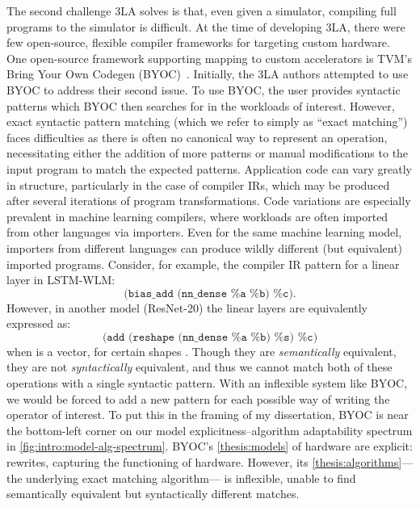 The second challenge 3LA solves
  is that,
  even given a simulator,
  compiling
  full programs to the simulator
  is difficult.
At the time of developing 3LA,
  there were few open-source, flexible 
  compiler frameworks
  for targeting custom hardware.
One open-source framework
  supporting mapping
  to custom accelerators
  is TVM's Bring Your Own Codegen (BYOC)~\cite{byoc,chen2021byoc}.
Initially, the 3LA authors
  attempted to use BYOC
  to address their second issue.
To use BYOC, the user
  provides syntactic patterns
  which BYOC then searches for
  in the workloads of interest.
However,
  exact syntactic pattern matching 
  (which we refer to simply as
    ``exact matching'')
  faces difficulties
  as there is often no canonical way
  to represent an operation,
  necessitating either the addition of more patterns
  or manual modifications to the input program
  to match the expected patterns.
Application code can vary greatly in structure,
  particularly in the case of compiler IRs,
  which may be produced after several iterations
  of program transformations.
Code variations are especially prevalent
  in machine learning compilers,
  where workloads are often imported
  from other languages via importers.
Even for the same machine learning model,
  importers from different languages
  can produce wildly different (but equivalent)
  imported programs.
Consider, for example,
  the compiler IR pattern for a linear layer
  in 
  LSTM-WLM:
\small
\[ \texttt{(bias\_add (nn\_dense \%a \%b) \%c)}. \]
\normalsize
However, 
  in another model (ResNet-20)
  the linear layers are equivalently expressed as: 
\small
\[ \texttt{(add (reshape (nn\_dense \%a \%b) \%s) \%c)} \]
\normalsize
when  is a vector, for certain shapes .
%
Though they are \textit{semantically}
  equivalent,
  they are not \textit{syntactically}
  equivalent,
  and thus
  we cannot match both of these operations
  with
  a single syntactic pattern.
With an inflexible system like BYOC,
  we would be forced to add
  a new pattern for each possible
  way of writing
  the operator of interest.
To put this in the framing of my dissertation,
  BYOC is near the bottom-left corner
  on our model explicitness--algorithm adaptability spectrum
  in \cref{fig:intro:model-alg-spectrum}.
BYOC's \cref{thesis:models}
  of hardware are explicit:
  rewrites, capturing the functioning of hardware.
However, its \cref{thesis:algorithms}---%
  the underlying exact matching algorithm---%
  is inflexible,
  unable to find semantically equivalent
  but syntactically different
  matches.



